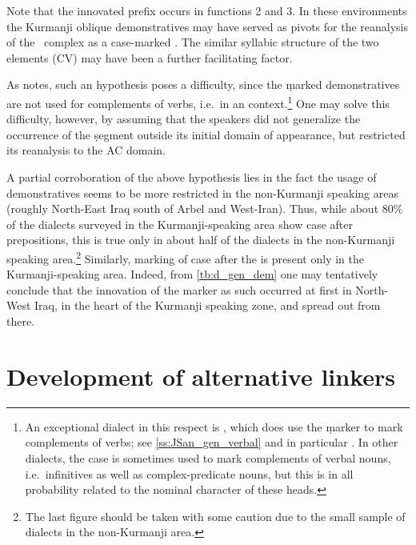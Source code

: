  Note that the  innovated \gen* prefix occurs in functions 2 and 3. In these environments the Kurmanji oblique demonstratives may have served as pivots for the reanalysis of the \ddet\ complex as a case-marked \dem*. The similar syllabic structure of the two elements (CV) may have been a further facilitating factor. 
 
 As \citet[124]{CohenEzafe} notes, such an hypothesis poses a difficulty, since the  \d marked demonstratives are not used for complements of verbs, i.e.\ in an \acc* context.\footnote{An exceptional dialect in this respect is \JSan, which does use the \d marker to mark complements of verbs; see \ref{ss:JSan_gen_verbal} and in particular . In other  dialects, the \gen* case is sometimes used to mark complements of verbal nouns, i.e.\ infinitives \citep[cf.][37, fn.\ 8]{SabarNerwa} as well as complex-predicate nouns, but this is in all probability related to the nominal character of these heads.} One may solve this difficulty, however, by assuming that the  speakers did not generalize the occurrence of the \d segment outside its initial domain of appearance, but restricted its reanalysis to the AC domain. 
 
A partial corroboration of the above hypothesis lies in the fact the usage of \gen* demonstratives seems to be more restricted in the non-Kurmanji speaking areas (roughly North-East Iraq south of Arbel and West-Iran). Thus, while about 80\% of the dialects surveyed in the Kurmanji-speaking area show \gen* case after prepositions, this is true only in  about half of the dialects in the non-Kurmanji speaking area.\footnote{The last figure should be taken with some caution due to the small sample of dialects in the non-Kurmanji area.} Similarly, marking of \gen* case after the \lnk* is present only in the Kurmanji-speaking area. Indeed, from \vref{tb:d_gen_dem} one may tentatively conclude that the innovation of the \gen* marker as such occurred at first in North-West Iraq, in the heart of the Kurmanji speaking zone, and spread out from there. 

\section{Development of alternative linkers} \label{ss:alt_lnk}

